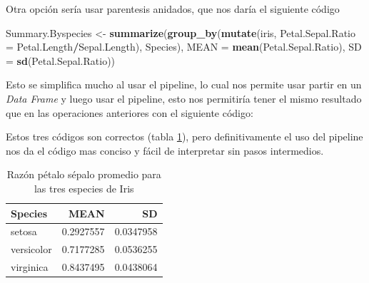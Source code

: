 \documentclass[]{book}
\newenvironment{Shaded}{\begin{snugshade}}{\end{snugshade}}
\newcommand{\DataTypeTok}[1]{\textcolor[rgb]{0.13,0.29,0.53}{#1}}
\newcommand{\KeywordTok}[1]{\textcolor[rgb]{0.13,0.29,0.53}{\textbf{#1}}}
\newcommand{\NormalTok}[1]{#1}
\newcommand{\OperatorTok}[1]{\textcolor[rgb]{0.81,0.36,0.00}{\textbf{#1}}}
\newcommand{\StringTok}[1]{\textcolor[rgb]{0.31,0.60,0.02}{#1}}
\begin{document}
Otra opción sería usar parentesis anidados, que nos daría el siguiente
código

\begin{Shaded}
\begin{Highlighting}[]
\NormalTok{Summary.Byspecies <-}\StringTok{ }\KeywordTok{summarize}\NormalTok{(}\KeywordTok{group_by}\NormalTok{(}\KeywordTok{mutate}\NormalTok{(iris, }\DataTypeTok{Petal.Sepal.Ratio =}\NormalTok{ Petal.Length}\OperatorTok{/}\NormalTok{Sepal.Length), }
\NormalTok{    Species), }\DataTypeTok{MEAN =} \KeywordTok{mean}\NormalTok{(Petal.Sepal.Ratio), }\DataTypeTok{SD =} \KeywordTok{sd}\NormalTok{(Petal.Sepal.Ratio))}
\end{Highlighting}
\end{Shaded}

Esto se simplifica mucho al usar el pipeline, lo cual nos permite usar
partir en un \emph{Data Frame} y luego usar el pipeline, esto nos
permitiría tener el mismo resultado que en las operaciones anteriores
con el siguiente código:

\begin{Shaded}
\end{Shaded}

Estos tres códigos son correctos (tabla \ref{tab:Pipe}), pero
definitivamente el uso del pipeline nos da el código mas conciso y fácil
de interpretar sin pasos intermedios.

\begin{table}

\caption{\label{tab:Pipe}Razón pétalo sépalo promedio para las tres especies de Iris}
\centering
\begin{tabular}[t]{lrr}
\toprule
Species & MEAN & SD\\
\midrule
setosa & 0.2927557 & 0.0347958\\
versicolor & 0.7177285 & 0.0536255\\
virginica & 0.8437495 & 0.0438064\\
\bottomrule
\end{tabular}
\end{table}
\end{document}
